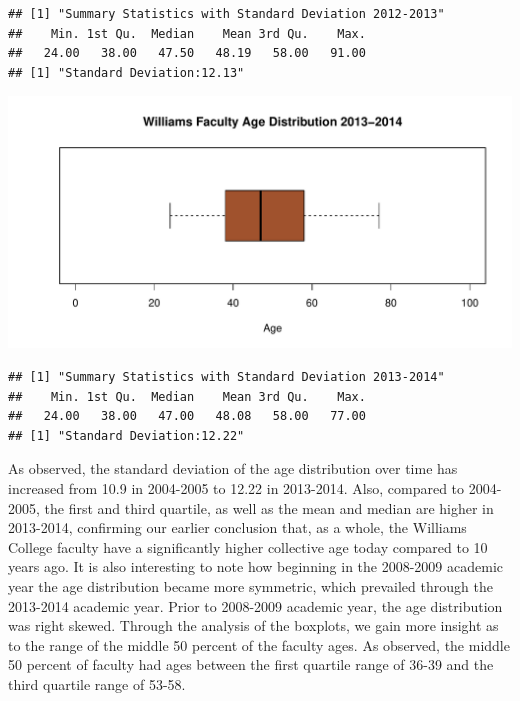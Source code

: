 \documentclass[12pt,a4paper]{article}\usepackage[]{graphicx}\usepackage[]{color}
\makeatletter
\def\maxwidth{ %
  \ifdim\Gin@nat@width>\linewidth
    \linewidth
  \else
    \Gin@nat@width
  \fi
}
\newenvironment{kframe}{%
 \def\at@end@of@kframe{}%
 \ifinner\ifhmode%
  \def\at@end@of@kframe{\end{minipage}}%
  \begin{minipage}{\columnwidth}%
 \fi\fi%
 \def\FrameCommand##1{\hskip\@totalleftmargin \hskip-\fboxsep
 \colorbox{shadecolor}{##1}\hskip-\fboxsep
     \hskip-\linewidth \hskip-\@totalleftmargin \hskip\columnwidth}%
 \MakeFramed {\advance\hsize-\width
   \@totalleftmargin\z@ \linewidth\hsize
   \@setminipage}}%
 {\par\unskip\endMakeFramed%
 \at@end@of@kframe}
\newenvironment{knitrout}{}{} %
\theoremstyle{definition}
\makeatother
\begin{document}
\begin{knitrout}
\color{fgcolor}\begin{kframe}
\begin{verbatim}
## [1] "Summary Statistics with Standard Deviation 2012-2013"
##    Min. 1st Qu.  Median    Mean 3rd Qu.    Max. 
##   24.00   38.00   47.50   48.19   58.00   91.00
## [1] "Standard Deviation:12.13"
\end{verbatim}
\end{kframe}
\end{knitrout}

\begin{knitrout}
\color{fgcolor}
\includegraphics[width=\maxwidth]{figure/unnamed-chunk-31-1} 

\end{knitrout}

\begin{knitrout}
\color{fgcolor}\begin{kframe}
\begin{verbatim}
## [1] "Summary Statistics with Standard Deviation 2013-2014"
##    Min. 1st Qu.  Median    Mean 3rd Qu.    Max. 
##   24.00   38.00   47.00   48.08   58.00   77.00
## [1] "Standard Deviation:12.22"
\end{verbatim}
\end{kframe}
\end{knitrout}

\bigskip
As observed, the standard deviation of the age distribution over time has increased from 10.9 in 2004-2005 to 12.22 in 2013-2014. Also, compared to 2004-2005, the first and third quartile, as well as the mean and median are higher in 2013-2014, confirming our earlier conclusion that, as a whole, the Williams College faculty have a significantly higher collective age today compared to 10 years ago. It is also interesting to note how beginning in the 2008-2009 academic year the age distribution became more symmetric, which prevailed through the 2013-2014 academic year. Prior to 2008-2009 academic year, the age distribution was right skewed. Through the analysis of the boxplots, we gain more insight as to the range of the middle 50 percent of the faculty ages. As observed, the middle 50 percent of faculty had ages between the first quartile range of 36-39 and the third quartile range of 53-58.
\end{document}

